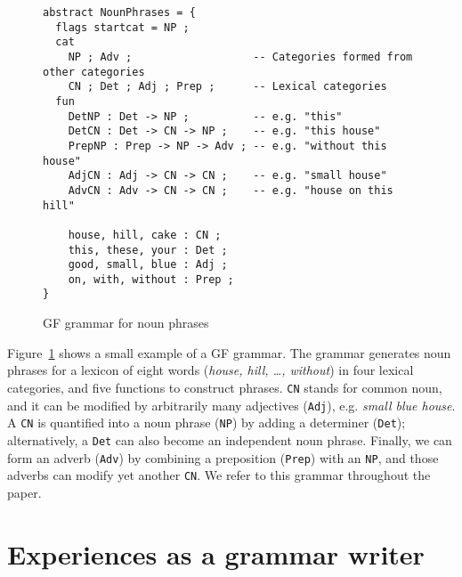 \documentclass[11pt]{article}
\def\t#1{\texttt{#1}}
\begin{document}




\begin{figure}[h]
  \centering
    \begin{verbatim}
abstract NounPhrases = {
  flags startcat = NP ;
  cat
    NP ; Adv ;                   -- Categories formed from other categories
    CN ; Det ; Adj ; Prep ;      -- Lexical categories
  fun
    DetNP : Det -> NP ;          -- e.g. "this"
    DetCN : Det -> CN -> NP ;    -- e.g. "this house"
    PrepNP : Prep -> NP -> Adv ; -- e.g. "without this house"
    AdjCN : Adj -> CN -> CN ;    -- e.g. "small house"
    AdvCN : Adv -> CN -> CN ;    -- e.g. "house on this hill"

    house, hill, cake : CN ;
    this, these, your : Det ;
    good, small, blue : Adj ;
    on, with, without : Prep ;
}
\end{verbatim}
  \caption{GF grammar for noun phrases}
\label{fig:exampleGrammar}
\end{figure}

Figure~\ref{fig:exampleGrammar} shows a small example of a GF
grammar. The grammar generates noun phrases for a lexicon of eight
words (\emph{house, hill, \dots, without}) in four lexical categories,
and five functions to construct phrases.  
\t{CN} stands for common noun, and it can be modified by arbitrarily
many adjectives (\t{Adj}), e.g. \emph{small blue house}. A \t{CN} is
quantified into a noun phrase (\t{NP}) by adding a determiner
(\t{Det}); alternatively, a \t{Det} can also become an independent
noun phrase. Finally, we can form an adverb (\t{Adv}) by combining a
preposition (\t{Prep}) with an \t{NP}, and those adverbs can modify
yet another \t{CN}. 
We refer to this grammar throughout the paper.



\section{Experiences as a grammar writer}
\end{document}
